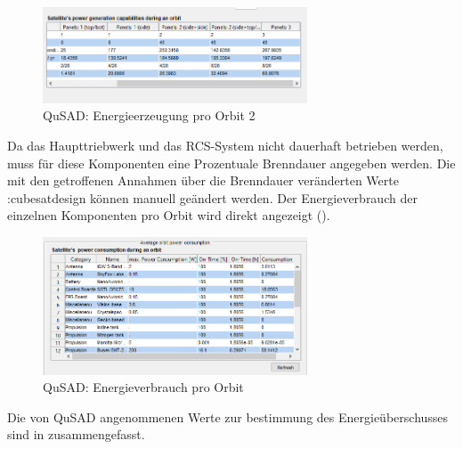 			\begin{figure}[!h]
				\centering
					\includegraphics[width=0.70\textwidth]{graphics/power4.PNG}
				\caption{QuSAD: Energieerzeugung pro Orbit 2}
				\label{fig:power4}
			\end{figure}
Da das Haupttriebwerk und das RCS-System nicht dauerhaft betrieben werden, muss für diese Komponenten eine Prozentuale Brenndauer angegeben werden. Die mit den getroffenen Annahmen über die Brenndauer veränderten Werte  \tab:{cubesatdesign} können manuell geändert werden. Der Energieverbrauch der einzelnen Komponenten pro Orbit wird direkt angezeigt ().\\
			
			\begin{figure}[!h]
				\centering
					\includegraphics[width=0.70\textwidth]{graphics/power5.png}
				\caption{QuSAD: Energieverbrauch pro Orbit}
				\label{fig:power5}
			\end{figure}
Die von QuSAD angenommenen Werte zur bestimmung des Energieüberschusses sind in   zusammengefasst.\\ 
			
